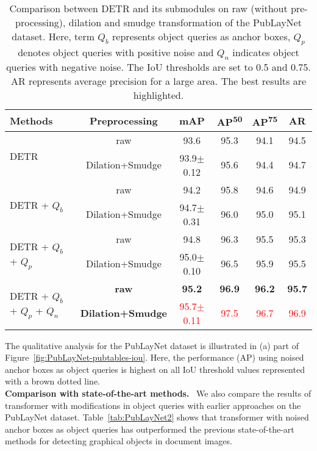 \documentclass[sn-mathphys]{sn-jnl}\jyear{2021}\theoremstyle{thmstyleone}\newtheorem{theorem}{Theorem}\newtheorem{proposition}[theorem]{Proposition}\theoremstyle{thmstyletwo}\newtheorem{example}{Example}\newtheorem{remark}{Remark}\theoremstyle{thmstylethree}\newtheorem{definition}{Definition}\usepackage{amsmath}
\begin{document}
\begin{table*}[h!]
\tiny
\begin{center}
\caption{Comparison between DETR and its submodules on raw
(without pre-processing), dilation and smudge transformation of the PubLayNet dataset. Here, term $Q_b$ represents object queries as anchor boxes, $Q_p$ denotes object queries with positive noise and $Q_n$ indicates object queries with negative noise. The IoU thresholds are set to 0.5 and 0.75. AR represents average precision for a large area. The best results are highlighted.}\label{tab:PubLayNet1}
\begin{tabular*}{\textwidth}{@{\extracolsep{\fill}}lccccc@{\extracolsep{\fill}}}
\toprule
\textbf{Methods} & \textbf{Preprocessing} &
\textbf{mAP} & 
\textbf{AP\textsuperscript{50}} &
\textbf{AP\textsuperscript{75}} & \textbf{AR} \\
\midrule
\multirow{2}{*}{DETR} & raw & 93.6 & 95.3 & 94.1 & 94.5\\
& Dilation+Smudge & 93.9$\pm$0.12 & 95.6 & 94.4  & 94.7\\
\midrule

\multirow{2}{*}{DETR + $Q_b$} & raw & 94.2 & 95.8 & 94.6 & 94.9\\
& Dilation+Smudge & 94.7$\pm$0.31 & 96.0 & 95.0  & 95.1\\
\midrule

\multirow{2}{*}{DETR + $Q_b$ + $Q_p$} & raw & 94.8 & 96.3 & 95.5 & 95.3 \\
& Dilation+Smudge & 95.0$\pm$0.10 & 96.5 & 95.9  & 95.5\\
\midrule

\multirow{2}{*}{DETR + $Q_b$ + $Q_p$ + $Q_n$} & \textbf{raw} & \textbf{95.2} & \textbf{96.9} & \textbf{96.2} & \textbf{95.7}\\
& \textbf{Dilation+Smudge} & \textcolor{red}{95.7$\pm$0.11} & \textcolor{red}{97.5} & \textcolor{red}{96.7} & \textcolor{red}{96.9}\\
\bottomrule
\end{tabular*}
\end{center}
\end{table*} 
The qualitative analysis for the PubLayNet dataset is illustrated in (a) part of Figure~\ref{fig:PubLayNet-pubtables-iou}. Here, the performance (AP) using noised anchor boxes as object queries is highest on all IoU threshold values represented with a brown dotted line. \\
\noindent\textbf{Comparison with state-of-the-art methods.}~
We also compare the results of transformer with modifications in object queries with earlier approaches on the PubLayNet dataset. Table~\ref{tab:PubLayNet2} shows that transformer with noised anchor boxes as object queries has outperformed the previous state-of-the-art methods for detecting graphical objects in document images.\\
\end{document}
